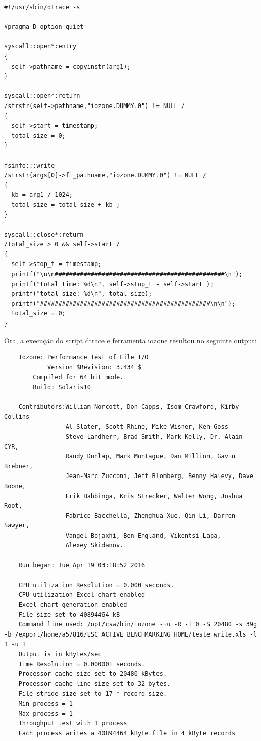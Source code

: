 \documentclass[a4paper]{article}
\begin{document}
{\begin{lstlisting}
#!/usr/sbin/dtrace -s

#pragma D option quiet

syscall::open*:entry
{
  self->pathname = copyinstr(arg1); 
}

syscall::open*:return
/strstr(self->pathname,"iozone.DUMMY.0") != NULL /
{
  self->start = timestamp; 
  total_size = 0;
}

fsinfo:::write 
/strstr(args[0]->fi_pathname,"iozone.DUMMY.0") != NULL /
{
  kb = arg1 / 1024;
  total_size = total_size + kb ; 
}

syscall::close*:return
/total_size > 0 && self->start /
{
  self->stop_t = timestamp; 
  printf("\n\n###############################################\n");
  printf("total time: %d\n", self->stop_t - self->start );
  printf("total size: %d\n", total_size);
  printf("###############################################\n\n");
  total_size = 0;
}
\end{lstlisting}

Ora, a execução do script dtrace e ferramenta iozone resultou no seguinte output:

\begin{lstlisting}
	Iozone: Performance Test of File I/O
	        Version $Revision: 3.434 $
		Compiled for 64 bit mode.
		Build: Solaris10 

	Contributors:William Norcott, Don Capps, Isom Crawford, Kirby Collins
	             Al Slater, Scott Rhine, Mike Wisner, Ken Goss
	             Steve Landherr, Brad Smith, Mark Kelly, Dr. Alain CYR,
	             Randy Dunlap, Mark Montague, Dan Million, Gavin Brebner,
	             Jean-Marc Zucconi, Jeff Blomberg, Benny Halevy, Dave Boone,
	             Erik Habbinga, Kris Strecker, Walter Wong, Joshua Root,
	             Fabrice Bacchella, Zhenghua Xue, Qin Li, Darren Sawyer,
	             Vangel Bojaxhi, Ben England, Vikentsi Lapa,
	             Alexey Skidanov.

	Run began: Tue Apr 19 03:18:52 2016

	CPU utilization Resolution = 0.000 seconds.
	CPU utilization Excel chart enabled
	Excel chart generation enabled
	File size set to 40894464 kB
	Command line used: /opt/csw/bin/iozone -+u -R -i 0 -S 20480 -s 39g -b /export/home/a57816/ESC_ACTIVE_BENCHMARKING_HOME/teste_write.xls -l 1 -u 1
	Output is in kBytes/sec
	Time Resolution = 0.000001 seconds.
	Processor cache size set to 20480 kBytes.
	Processor cache line size set to 32 bytes.
	File stride size set to 17 * record size.
	Min process = 1 
	Max process = 1 
	Throughput test with 1 process
	Each process writes a 40894464 kByte file in 4 kByte records


\end{lstlisting}}
\end{document}
